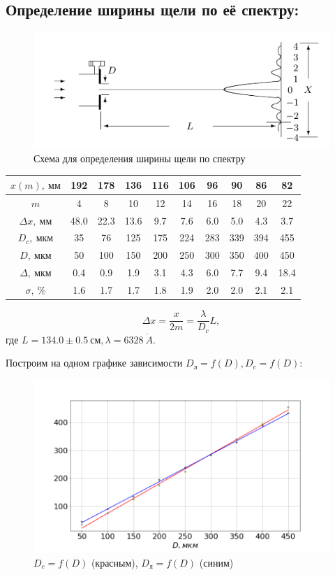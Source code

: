 \documentclass[a4paper, 12pt]{article}%
\begin{document}
	\subsection{Определение ширины щели по её спектру:}
	
\begin{figure}[H]
	\includegraphics[width = 1.0\linewidth]{pics/2.png}
	\caption*{Схема для определения ширины щели по спектру}
\end{figure}
\begin{table}[H]
	\centering
	\begin{tabular}{|c|c|c|c|c|c|c|c|c|c|}  \hline
	$x(m),\ мм$ & 192 & 178 & 136 & 116 & 106 & 96 & 90 & 86 & 82 \\\hline
	$m$ & 4 & 8 & 10 & 12 & 14 & 16 & 18 & 20 & 22 \\\hline
	$\Delta x,\ мм$ & 48.0 & 22.3 & 13.6 & 9.7 & 7.6 & 6.0 & 5.0 & 4.3 & 3.7 \\\hline
	$D_c,\ мкм$ & 35 & 76 & 125 & 175 & 224 & 283 & 339 &  394  & 455 \\\hline
	$D,\ мкм$ & 50 & 100 & 150 & 200 & 250 & 300 & 350 & 400 & 450 \\\hline
	$\Delta,\ мкм$ & 0.4 & 0.9 & 1.9 & 3.1 & 4.3 & 6.0 & 7.7 & 9.4 & 18.4 \\\hline
	$\sigma,\ \%$ & 1.6 & 1.7 & 1.7 & 1.8 & 1.9 & 2.0 & 2.0 & 2.1 & 2.1 \\\hline
	\end{tabular}
	\end{table}
\[
	\Delta x = \frac{x}{2m} = \frac{\lambda}{D_c}L,
\]	
где $L = 134.0 \pm 0.5\ см, \lambda = 6328\ \dot A $.

Построим на одном графике зависимости $D_{\text{л}} = f(D), D_c = f(D)$:
	\begin{figure}[H]
	\includegraphics[width = 1.0\linewidth]{pics/g1.png}
	\caption*{$D_c = f(D)$ (красным), $D_{\text{л}}  = f(D)$ (синим)}
	
\end{figure}	
\end{document}
